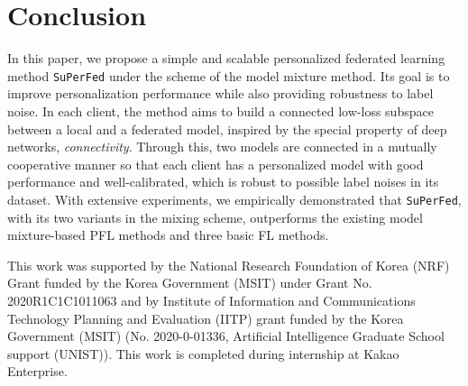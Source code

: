 \documentclass[sigconf]{acmart}
\begin{document}
\section{Conclusion}
In this paper, we propose a simple and scalable personalized federated learning method \texttt{SuPerFed} under the scheme of the model mixture method. Its goal is to improve personalization performance while also providing robustness to label noise. In each client, the method aims to build a connected low-loss subspace between a local and a federated model, inspired by the special property of deep networks, \textit{connectivity}. Through this, two models are connected in a mutually cooperative manner so that each client has a personalized model with good performance and well-calibrated, which is robust to possible label noises in its dataset. With extensive experiments, we empirically demonstrated that \texttt{SuPerFed}, with its two variants in the mixing scheme, outperforms the existing model mixture-based PFL methods and three basic FL methods.

\begin{acks}
This work was supported by the National Research Foundation of Korea (NRF) Grant funded by the Korea Government (MSIT) under Grant No. 2020R1C1C1011063 and by Institute of Information and Communications Technology Planning and Evaluation (IITP) grant funded by the Korea Government (MSIT) (No. 2020-0-01336, Artificial Intelligence Graduate School support (UNIST)). This work is completed during internship at Kakao Enterprise.
\end{acks}




\clearpage
\appendix
\setcounter{table}{0}
\renewcommand{\thetable}{A\arabic{table}}
\setcounter{figure}{0}
\renewcommand{\thefigure}{A\arabic{figure}}
\end{document}
